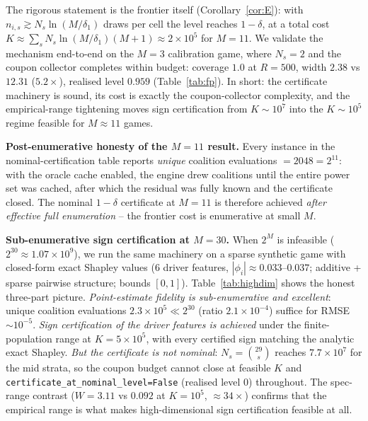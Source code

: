 \documentclass[11pt,twocolumn]{article}
\begin{document}
The rigorous statement is the frontier itself (Corollary~\ref{cor:E}):
with $n_{i,s}\gtrsim N_s\ln(M/\delta_1)$ draws per cell the level reaches
$1-\delta$, at a total cost
$K\approx\sum_s N_s\ln(M/\delta_1)(M+1)\approx2\times10^5$ for $M=11$.
We validate the mechanism end-to-end on the $M=3$ calibration game, where
$N_s=2$ and the coupon collector completes within budget: coverage $1.0$ at
$R=500$, width $2.38$ vs $12.31$ ($5.2\times$), realised level $0.959$
(Table~\ref{tab:fp}).  In short: the certificate machinery is sound, its
cost is exactly the coupon-collector complexity, and the empirical-range
tightening moves sign certification from $K\sim10^7$ into the $K\sim10^5$
regime feasible for $M\approx11$ games.

\textbf{Post-enumerative honesty of the $M{=}11$ result.}  Every instance in
the nominal-certification table reports \emph{unique} coalition evaluations
$=2048=2^{11}$: with the oracle cache enabled, the engine drew coalitions
until the entire power set was cached, after which the residual was fully
known and the certificate closed.  The nominal $1-\delta$ certificate at
$M{=}11$ is therefore achieved \emph{after effective full enumeration} --
the frontier cost is enumerative at small $M$.

\textbf{Sub-enumerative sign certification at $M{=}30$.}  When $2^M$ is
infeasible ($2^{30}\approx1.07\times10^9$), we run the same machinery on a
sparse synthetic game with closed-form exact Shapley values (6 driver
features, $|\phi_i|\approx0.033$--$0.037$; additive + sparse pairwise
structure; bounds $[0,1]$).  Table~\ref{tab:highdim} shows the honest
three-part picture.  \emph{Point-estimate fidelity is sub-enumerative and
excellent}: unique coalition evaluations $2.3\times10^5 \ll 2^{30}$
(ratio $2.1\times10^{-4}$) suffice for RMSE $\sim10^{-5}$.  \emph{Sign
certification of the driver features is achieved} under the
finite-population range at $K=5\times10^5$, with every certified sign
matching the analytic exact Shapley.  \emph{But the certificate is
\emph{not} nominal}: $N_s=\binom{29}{s}$ reaches $7.7\times10^7$ for the
mid strata, so the coupon budget cannot close at feasible $K$ and
\texttt{certificate\_at\_nominal\_level=False} (realised level $0$)
throughout.  The spec-range contrast ($W{=}3.11$ vs $0.092$ at $K{=}10^5$,
$\approx34\times$) confirms that the empirical range is what makes
high-dimensional sign certification feasible at all.
\end{document}
